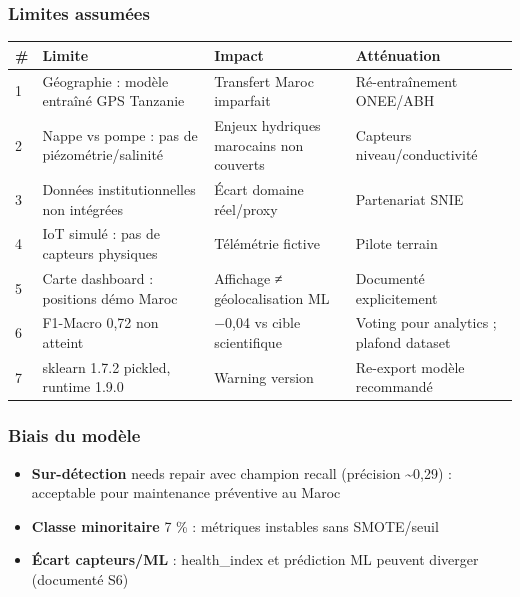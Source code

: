 \documentclass[11pt,a4paper]{report}
\begin{document}
\subsubsection{Limites assumées}



\begin{longtable}{@{}llll@{}}
\toprule
\# & Limite & Impact & Atténuation \\
\midrule
1 & Géographie : modèle entraîné GPS Tanzanie & Transfert Maroc imparfait & Ré-entraînement ONEE/ABH \\
2 & Nappe vs pompe : pas de piézométrie/salinité & Enjeux hydriques marocains non couverts & Capteurs niveau/conductivité \\
3 & Données institutionnelles non intégrées & Écart domaine réel/proxy & Partenariat SNIE \\
4 & IoT simulé : pas de capteurs physiques & Télémétrie fictive & Pilote terrain \\
5 & Carte dashboard : positions démo Maroc & Affichage ≠ géolocalisation ML & Documenté explicitement \\
6 & F1-Macro 0,72 non atteint & −0,04 vs cible scientifique & Voting pour analytics ; plafond dataset \\
7 & sklearn 1.7.2 pickled, runtime 1.9.0 & Warning version & Re-export modèle recommandé \\
\bottomrule
\end{longtable}




\subsubsection{Biais du modèle}



\begin{itemize}

\item \textbf{Sur-détection} needs repair avec champion recall (précision \textasciitilde{}0,29) : acceptable pour maintenance préventive au Maroc

\item \textbf{Classe minoritaire} 7 \% : métriques instables sans SMOTE/seuil

\item \textbf{Écart capteurs/ML} : health\_index et prédiction ML peuvent diverger (documenté S6)

\end{itemize}
\end{document}
